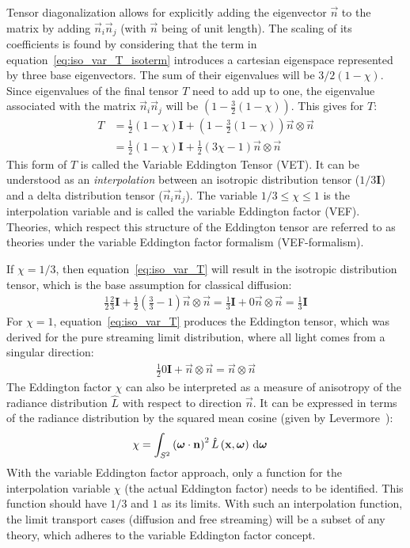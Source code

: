 Tensor diagonalization allows for explicitly adding the eigenvector $\vec{n}$ to the matrix by adding $\vec{n}_i\vec{n}_j$ (with $\vec{n}$ being of unit length). The scaling of its coefficients is found by considering that the term in equation~\ref{eq:iso_var_T_isoterm} introduces a cartesian eigenspace represented by three base eigenvectors. The sum of their eigenvalues will be $3/2(1-\chi)$. Since eigenvalues of the final tensor $T$ need to add up to one, the eigenvalue associated with the matrix $\vec{n}_i\vec{n}_j$ will be $\left(1- \frac{3}{2}\left(1 - \chi\right)\right)$. This gives for $T$:
\begin{align}
T &= \frac{1}{2}\left(1-\chi\right)\mathbf{I} + \left(1- \frac{3}{2}\left(1 - \chi\right)\right) \vec{n}\otimes\vec{n}
\nonumber
\\
&= \frac{1}{2}\left(1-\chi\right)\mathbf{I} + \frac{1}{2}\left(3\chi-1\right) \vec{n}\otimes\vec{n}
\label{eq:iso_var_T}
\end{align}
This form of $T$ is called the Variable Eddington Tensor (VET). It can be understood as an \emph{interpolation} between an isotropic distribution tensor ($1/3\mathbf{I}$) and a delta distribution tensor ($\vec{n}_i\vec{n}_j$). The variable $1/3 \le \chi \le 1$ is the interpolation variable and is called the variable Eddington factor (VEF). Theories, which respect this structure of the Eddington tensor are referred to as theories under the variable Eddington factor formalism (VEF-formalism).

If $\chi=1/3$, then equation~\ref{eq:iso_var_T} will result in the isotropic distribution tensor, which is the base assumption for classical diffusion:
\begin{align}
\frac{1}{2}\frac{2}{3}\mathbf{I} + \frac{1}{2}\left(\frac{3}{3}-1\right) \vec{n}\otimes\vec{n}
=\frac{1}{3}\mathbf{I} + 0\vec{n}\otimes\vec{n} = \frac{1}{3}\mathbf{I}
\end{align}
For $\chi=1$, equation~\ref{eq:iso_var_T} produces the Eddington tensor, which was derived for the pure streaming limit distribution, where all light comes from a singular direction:
\begin{align}
\frac{1}{2}0\mathbf{I} + \vec{n}\otimes\vec{n}
= \vec{n}\otimes\vec{n}
\end{align}
The Eddington factor $\chi$ can also be interpreted as a measure of anisotropy of the radiance distribution $\widehat{L}$ with respect to direction $\vec{n}$. It can be expressed in terms of the radiance distribution by the squared mean cosine (given by Levermore~\cite{Levermore84}):
\begin{align}
\chi &= \int_{S^2}{ \left(\boldsymbol{\mathbf{\omega}}\cdot\boldsymbol{\mathbf{n}}\right)^2\hat{L}\left(\boldsymbol{\mathbf{x}}, \boldsymbol{\mathbf{\omega}}\right)\,\mathrm{d}\boldsymbol{\mathbf{\omega}}}
\label{eq:iso_var_chi}
\end{align}
With the variable Eddington factor approach, only a function for the interpolation variable $\chi$ (the actual Eddington factor) needs to be identified. This function should have $1/3$ and $1$ as its limits. With such an interpolation function, the limit transport cases (diffusion and free streaming) will be a subset of any theory, which adheres to the variable Eddington factor concept.

